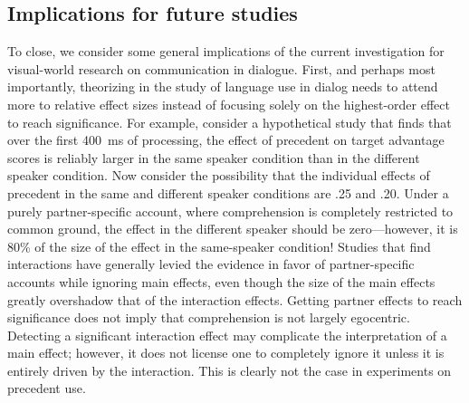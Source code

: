\documentclass[doc,fignum,apacite,floatsintext]{apa6}
\begin{document}
\subsection{Implications for future studies}


To close, we consider some general implications of the current investigation for visual-world research on communication in dialogue.  First, and perhaps most importantly, theorizing in the study of language use in dialog needs to attend more to relative effect sizes instead of focusing solely on the highest-order effect to reach significance.  For example, consider a hypothetical study that finds that over the first 400~ms of processing, the effect of precedent on target advantage scores is reliably larger in the same speaker condition than in the different speaker condition.  Now consider the possibility that the individual effects of precedent in the same and different speaker conditions are .25 and .20.  Under a purely partner-specific account, where comprehension is completely restricted to common ground, the effect in the different speaker should be zero---however, it is 80\% of the size of the effect in the same-speaker condition!  Studies that find interactions have generally levied the evidence in favor of partner-specific accounts while ignoring main effects, even though the size of the main effects greatly overshadow that of the interaction effects.  Getting partner effects to reach significance does not imply that comprehension is not largely egocentric.  Detecting a significant interaction effect may complicate the interpretation of a main effect; however, it does not license one to completely ignore it unless it is entirely driven by the interaction.  This is clearly not the case in experiments on precedent use.
\end{document}
